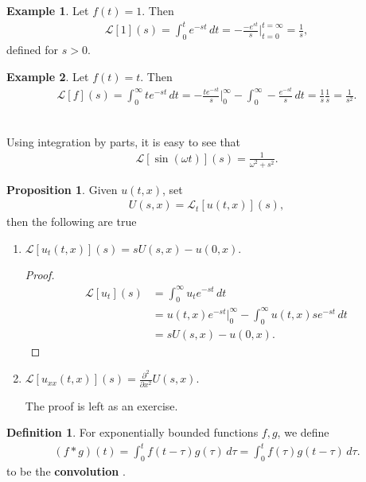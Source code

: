 \documentclass{book}
\theoremstyle{definition}
\newtheorem{defn}{Definition}[section]
\newtheorem{prop}{Proposition}[section]
\newtheorem{exmp}{Example}[section]
\newcommand{\p}{\partial}
\newcommand{\lag}{\mathcal{L}}
\newcommand{\w}{\omega}
\newcommand{\f}[2]{\frac{#1}{#2}}
\begin{document}
\begin{exmp}
	Let $f(t) = 1$. Then
	\begin{align*}
	\lag[1](s) = \int_0^t e^{-st}\,dt = -\f{-e^{st}}{s}\bigg\vert^{t=\infty}_{t = 0} = \f{1}{s},
	\end{align*}	
	defined for $s>0$. 
\end{exmp}


\begin{exmp}
	Let $f(t) = t$. Then
	\begin{align*}
	\lag[f](s) = \int_0^\infty te^{-st}\,dt = -\f{te^{-st}}{s}\bigg\vert^\infty_0 - \int_0^\infty -\f{e^{-st}}{s}\,dt = \f{1}{s}\f{1}{s} = \f{1}{s^2}.
	\end{align*}
	$\,$\\
\end{exmp}



Using integration by parts, it is easy to see that 
\begin{align*}
\lag[\sin(\w t)](s) = \f{1}{\w^2 + s^2}.
\end{align*}


\begin{prop}
	Given $u(t,x)$, set
	\begin{align*}
	U(s,x) = \lag_t[u(t,x)](s),
	\end{align*}
	then the following are true
	\begin{enumerate}
		\item $\lag[u_t(t,x)](s) = sU(s,x) - u(0,x)$.
		
		\begin{proof}
			\begin{align*}
			\lag[u_t](s) &= \int_0^\infty u_t e^{-st}\,dt \\ 
			&=  u(t,x)e^{-st}\bigg\vert^\infty_0 - \int_0^\infty u(t,x)se^{-st}\,dt \\
			&= sU(s,x) - u(0,x).
			\end{align*}
		\end{proof}
		
		\item $\lag[u_{xx}(t,x)](s) = \f{\p^2}{\p x^2}U(s,x)$.
		
		The proof is left as an exercise.\\
	\end{enumerate}
\end{prop}

\begin{defn}
For exponentially bounded functions $f,g$, we define
\begin{align*}
(f\ast g)(t) = \int_0^t f(t-\tau)g(\tau)\,d\tau = \int_0^t f(\tau)g(t-\tau)\,d\tau.
\end{align*}
to be the \textbf{convolution} .
\end{defn}
\end{document}
